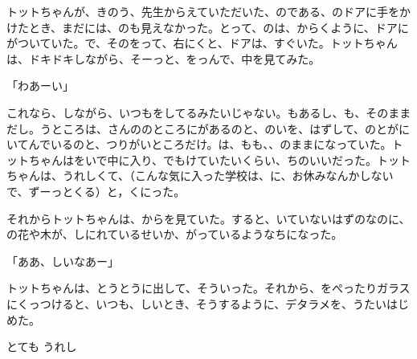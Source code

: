 トットちゃんが、きのう、先生からえていただいた、のである、のドアに手をかけたとき、まだには、のも見えなかった。とって、のは、からくように、ドアにがついていた。で、そのをって、右にくと、ドアは、すぐいた。トットちゃんは、ドキドキしながら、そーっと、をっんで、中を見てみた。

「わあーい」

これなら、しながら、いつもをしてるみたいじゃない。もあるし、も、そのままだし。うところは、さんののところにがあるのと、のいを、はずして、のとがにいてんでいるのと、つりがいところだけ。は、もも、、のままになっていた。トットちゃんはをいで中に入り、でもけていたいくらい、ちのいいだった。トットちゃんは、うれしくて、（こんな気に入った学校は、に、お休みなんかしないで、ずーっとくる）と，くにった。

それからトットちゃんは、からを見ていた。すると、いていないはずのなのに、の花や木が、しにれているせいか、がっているようなちになった。

「ああ、しいなあー」

トットちゃんは、とうとうに出して、そういった。それから、をぺったりガラスにくっつけると、いつも、しいとき、そうするように、デタラメを、うたいはじめた。

 とても うれし

